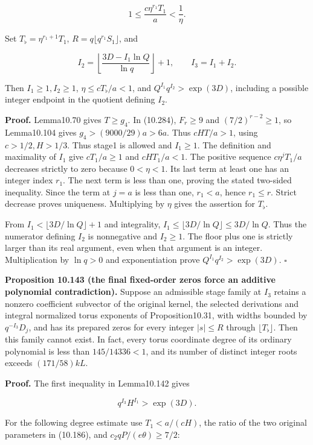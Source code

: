 \documentclass[
  11pt,
  a4paper,
]{article}
\begin{document}
\[
1\le\frac{c\eta^{r_1}T_1}{a}<\frac1\eta.
\tag{10.394}
\]

Set \(T_\flat=\eta^{r_1+1}T_1\), \(R=q\lfloor q^{r_1}S_1\rfloor\), and

\[
I_2=\left\lfloor\frac{3D-I_1\ln Q}{\ln q}\right\rfloor+1,
\qquad I_3=I_1+I_2.
\tag{10.395}
\]

Then \(I_1\ge1,I_2\ge1\), \(\eta\le cT_\flat/a<1\), and
\(Q^{I_1}q^{I_2}>\exp(3D)\), including a possible integer endpoint in
the quotient defining \(I_2\).

\textbf{Proof.} Lemma10.70 gives \(T\ge g_4\). In (10.284), \(F_r\ge9\)
and \((7/2)^{r-2}\ge1\), so Lemma10.104 gives \(g_4>(9000/29)a>6a\).
Thus \(cHT/a>1\), using \(c>1/2,H>1/3\). Thus stage1 is allowed and
\(I_1\ge1\). The definition and maximality of \(I_1\) give
\(cT_1/a\ge1\) and \(cHT_1/a<1\). The positive sequence \(c\eta^jT_1/a\)
decreases strictly to zero because \(0<\eta<1\). Its last term at least
one has an integer index \(r_1\). The next term is less than one,
proving the stated two-sided inequality. Since the term at \(j=a\) is
less than one, \(r_1<a\), hence \(r_1\le r\). Strict decrease proves
uniqueness. Multiplying by \(\eta\) gives the assertion for \(T_\flat\).

From \(I_1<\lfloor3D/\ln Q\rfloor+1\) and integrality,
\(I_1\le\lfloor3D/\ln Q\rfloor\le3D/\ln Q\). Thus the numerator defining
\(I_2\) is nonnegative and \(I_2\ge1\). The floor plus one is strictly
larger than its real argument, even when that argument is an integer.
Multiplication by \(\ln q>0\) and exponentiation prove
\(Q^{I_1}q^{I_2}>\exp(3D)\). \(\square\)

\textbf{Proposition 10.143 (the final fixed-order zeros force an
additive polynomial contradiction).} Suppose an admissible stage family
at \(I_3\) retains a nonzero coefficient subvector of the original
kernel, the selected derivations and integral normalized torus exponents
of Proposition10.31, with widths bounded by \(q^{-I_3}D_j\), and has its
prepared zeros for every integer \(|s|\le R\) through
\(\lfloor T_\flat\rfloor\). Then this family cannot exist. In fact,
every torus coordinate degree of its ordinary polynomial is less than
\(145/14336<1\), and its number of distinct integer roots exceeds
\((171/58)kL\).

\textbf{Proof.} The first inequality in Lemma10.142 gives

\[
q^{I_3}H^{I_1}>\exp(3D).
\tag{10.396}
\]

For the following degree estimate use \(T_1<a/(cH)\), the ratio of the
two original parameters in (10.186), and \(c_2qP/(e\theta)\ge7/2\):
\end{document}
